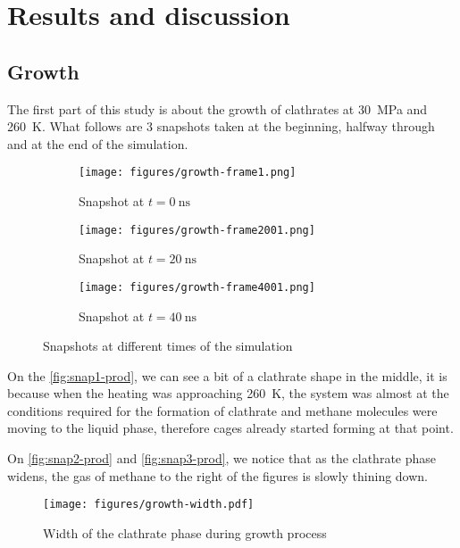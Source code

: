 \newpage
\section{Results and discussion}
\subsection{Growth}
The first part of this study is about the growth of clathrates at \SI{30}{\mega\pascal} and \SI{260}{\kelvin}. What follows are 3 snapshots taken at the beginning, halfway through and at the end of the simulation.

\begin{figure}[htbp]
    \centering
    \begin{subfigure}[b]{1.\linewidth}
        \centering
        \texttt{[image: figures/growth-frame1.png]}
        \caption{Snapshot at $t = \SI{0}{\nano\second}$}
        \label{fig:snap1-prod}
    \end{subfigure}
    \begin{subfigure}[b]{1.\linewidth}
        \centering
        \texttt{[image: figures/growth-frame2001.png]}
        \caption{Snapshot at $t = \SI{20}{\nano\second}$}
        \label{fig:snap2-prod}
    \end{subfigure}
    \begin{subfigure}[b]{1.\linewidth}
        \centering
        \texttt{[image: figures/growth-frame4001.png]}
        \caption{Snapshot at $t = \SI{40}{\nano\second}$}
        \label{fig:snap3-prod}
    \end{subfigure}
    \caption{Snapshots at different times of the simulation}
    \label{fig:snaps-prod}
\end{figure}

On the \autoref{fig:snap1-prod}, we can see a bit of a clathrate shape in the middle, it is because when the heating was approaching \SI{260}{\kelvin}, the system was almost at the conditions required for the formation of clathrate and methane molecules were moving to the liquid phase, therefore cages already started forming at that point.

On \autoref{fig:snap2-prod} and \autoref{fig:snap3-prod}, we notice that as the clathrate phase widens, the gas of methane to the right of the figures is slowly thining down. 

\begin{figure}[htbp]
    \centering
    \texttt{[image: figures/growth-width.pdf]}
    \caption{Width of the clathrate phase during growth process}
    \label{fig:width-growth}
\end{figure}

